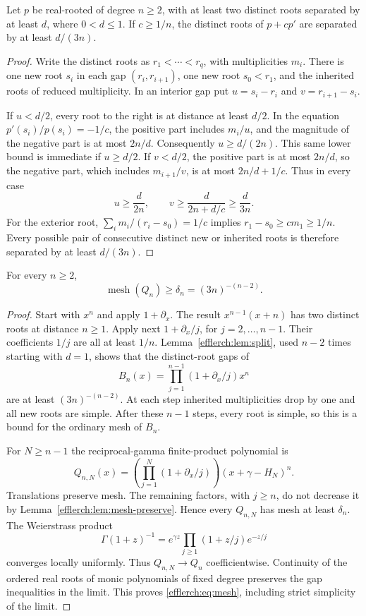 \begin{lemma}
\label{efflerch:lem:split}
Let $p$ be real-rooted of degree $n\geq2$, with at least two distinct
roots separated by at least $d$, where $0<d\leq1$.  If $c\geq1/n$,
the distinct roots of $p+cp'$ are separated by at least $d/(3n)$.
\end{lemma}
\begin{proof}
Write the distinct roots as $r_1<\cdots<r_q$, with multiplicities $m_i$.
There is one new root $s_i$ in each gap $(r_i,r_{i+1})$, one new root
$s_0<r_1$, and the inherited roots of reduced multiplicity.  In an
interior gap put $u=s_i-r_i$ and $v=r_{i+1}-s_i$.

If $u<d/2$, every root to the right is at distance at least $d/2$.
In the equation $p'(s_i)/p(s_i)=-1/c$, the positive part includes
$m_i/u$, and the magnitude of the negative part is at most $2n/d$.
Consequently $u\geq d/(2n)$.  This same lower bound is immediate
if $u\geq d/2$.
If $v<d/2$, the positive part is at most $2n/d$, so the negative
part, which includes $m_{i+1}/v$, is at most $2n/d+1/c$.
Thus in every case
\[
 u\geq\frac{d}{2n},\qquad
 v\geq\frac{d}{2n+d/c}\geq\frac{d}{3n}.
\]
For the exterior root,
$\sum_i m_i/(r_i-s_0)=1/c$ implies $r_1-s_0\geq cm_1\geq1/n$.
Every possible pair of consecutive distinct new or inherited roots
is therefore separated by at least $d/(3n)$.
\end{proof}

\begin{proposition}
\label{efflerch:prop:mesh}
For every $n\geq2$,
\begin{equation}\label{efflerch:eq:mesh}
 \operatorname{mesh}(Q_n)\geq\delta_n=(3n)^{-(n-2)}.
\end{equation}
\end{proposition}
\begin{proof}
Start with $x^n$ and apply $1+\partial_x$.  The result
$x^{n-1}(x+n)$ has two distinct roots at distance $n\geq1$.
Apply next $1+\partial_x/j$, for $j=2,\ldots,n-1$.
Their coefficients $1/j$ are all at least $1/n$.
Lemma~\ref{efflerch:lem:split}, used $n-2$ times starting with $d=1$,
shows that the distinct-root gaps of
\[
 B_n(x)=\prod_{j=1}^{n-1}(1+\partial_x/j)x^n
\]
are at least $(3n)^{-(n-2)}$.  At each step inherited multiplicities
drop by one and all new roots are simple.  After these $n-1$ steps,
every root is simple, so this is a bound for the ordinary mesh of $B_n$.

For $N\geq n-1$ the reciprocal-gamma finite-product polynomial is
\[
 Q_{n,N}(x)=
  \left(\prod_{j=1}^N(1+\partial_x/j)\right)(x+\gamma-H_N)^n.
\]
Translations preserve mesh.  The remaining factors, with $j\geq n$,
do not decrease it by Lemma~\ref{efflerch:lem:mesh-preserve}.
Hence every $Q_{n,N}$ has mesh at least $\delta_n$.
The Weierstrass product
\[
 \Gamma(1+z)^{-1}=e^{\gamma z}
   \prod_{j\geq1}(1+z/j)e^{-z/j}
\]
converges locally uniformly.  Thus $Q_{n,N}\to Q_n$ coefficientwise.
Continuity of the ordered real roots of monic polynomials of fixed
degree preserves the gap inequalities in the limit.  This proves
\eqref{efflerch:eq:mesh}, including strict simplicity of the limit.
\end{proof}

